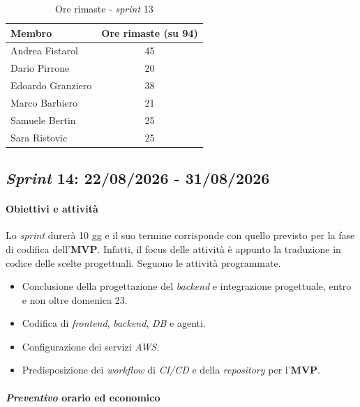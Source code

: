 \documentclass[12pt, a4paper]{article}
\begin{document}
{\begin{table}[H]
    \centering
    \renewcommand{\arraystretch}{1.3}
    \begin{tabularx}{0.7\textwidth}{|X|c|}
        \hline
         \textbf{Membro} & \textbf{Ore rimaste (su 94)} \\ \hline
         Andrea Fistarol & 45 \\ \hline
         Dario Pirrone & 20 \\ \hline
         Edoardo Granziero & 38 \\ \hline
         Marco Barbiero & 21 \\ \hline
         Samuele Bertin & 25 \\ \hline
         Sara Ristovic & 25 \\ \hline
    \end{tabularx}
    \caption{Ore rimaste - \textit{sprint} 13}
\end{table}

\subsection{\textit{Sprint} 14: 22/08/2026 - 31/08/2026}
\paragraph{Obiettivi e attività} Lo \textit{sprint} durerà 10 gg e il suo termine corrisponde con quello previsto per la fase di codifica dell'\textbf{MVP}.
Infatti, il focus delle attività è appunto la traduzione in codice delle scelte progettuali. Seguono le attività programmate.
\begin{itemize}
    \item Conclusione della progettazione del \textit{backend} e integrazione progettuale, entro e non oltre domenica 23.
    \item Codifica di \textit{frontend}, \textit{backend}, \textit{DB} e agenti.
    \item Configurazione dei servizi \textit{AWS}.
    \item Predisposizione dei \textit{workflow} di \textit{CI/CD} e della \textit{repository} per l'\textbf{MVP}.
\end{itemize}

\paragraph{\textit{Preventivo} orario ed economico}

}
\end{document}
